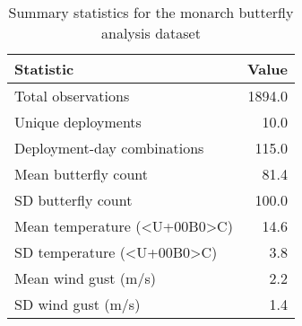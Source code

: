 \begin{table}

\caption{\label{tab:export-data-summary}Summary statistics for the monarch butterfly analysis dataset}
\centering
\begin{tabular}[t]{lr}
\toprule
Statistic & Value\\
\midrule
Total observations & 1894.0\\
Unique deployments & 10.0\\
Deployment-day combinations & 115.0\\
Mean butterfly count & 81.4\\
SD butterfly count & 100.0\\
\addlinespace
Mean temperature (<U+00B0>C) & 14.6\\
SD temperature (<U+00B0>C) & 3.8\\
Mean wind gust (m/s) & 2.2\\
SD wind gust (m/s) & 1.4\\
\bottomrule
\end{tabular}
\end{table}
